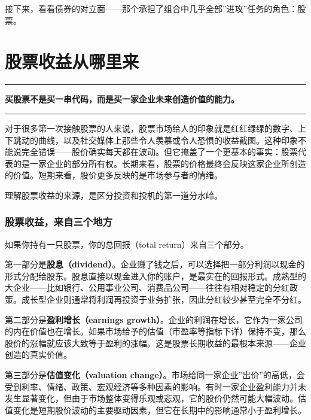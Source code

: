 \documentclass[a4paper,11pt,oneside,fontset=none,UTF8,zihao=-4]{ctexbook}
\begin{document}
接下来，看看债券的对立面------那个承担了组合中几乎全部''进攻''任务的角色：股票。

\newpage

\chapter{股票收益从哪里来}\label{ux80a1ux7968ux6536ux76caux4eceux54eaux91ccux6765}

\begin{center}{\color{dh-bronze}\rule{0.2\textwidth}{0.5pt}}\end{center}

\begin{dhquote}
\textbf{买股票不是买一串代码，而是买一家企业未来创造价值的能力。}
\end{dhquote}

\begin{center}{\color{dh-bronze}\rule{0.2\textwidth}{0.5pt}}\end{center}

对于很多第一次接触股票的人来说，股票市场给人的印象就是红红绿绿的数字、上下跳动的曲线，以及社交媒体上那些令人羡慕或令人恐惧的收益截图。这种印象不能说完全错误------股价确实每天都在波动。但它掩盖了一个更基本的事实：股票代表的是一家企业的部分所有权。长期来看，股票的价格最终会反映这家企业所创造的价值。短期来看，股价更多反映的是市场参与者的情绪。

理解股票收益的来源，是区分投资和投机的第一道分水岭。

\subsection{股票收益，来自三个地方}\label{ux80a1ux7968ux6536ux76caux6765ux81eaux4e09ux4e2aux5730ux65b9}

如果你持有一只股票，你的总回报（total return）来自三个部分。

第一部分是\textbf{股息（dividend）}。企业赚了钱之后，可以选择把一部分利润以现金的形式分配给股东。股息直接以现金进入你的账户，是最实在的回报形式。成熟型的大企业------比如银行、公用事业公司、消费品公司------往往有相对稳定的分红政策。成长型企业则通常将利润再投资于业务扩张，因此分红较少甚至完全不分红。

第二部分是\textbf{盈利增长（earnings
growth）}。企业的利润在增长，它作为一家公司的内在价值也在增长。如果市场给予的估值（市盈率等指标下详）保持不变，那么股价的涨幅就应该大致等于盈利的涨幅。这是股票长期收益的最根本来源------企业创造的真实价值。

第三部分是\textbf{估值变化（valuation
change）}。市场给同一家企业''出价''的高低，会受到利率、情绪、政策、宏观经济等多种因素的影响。有时一家企业盈利能力并未发生显著变化，但由于市场整体变得乐观或悲观，它的股价仍然可能大幅波动。估值变化是短期股价波动的主要驱动因素，但它在长期中的影响通常小于盈利增长。
\end{document}
